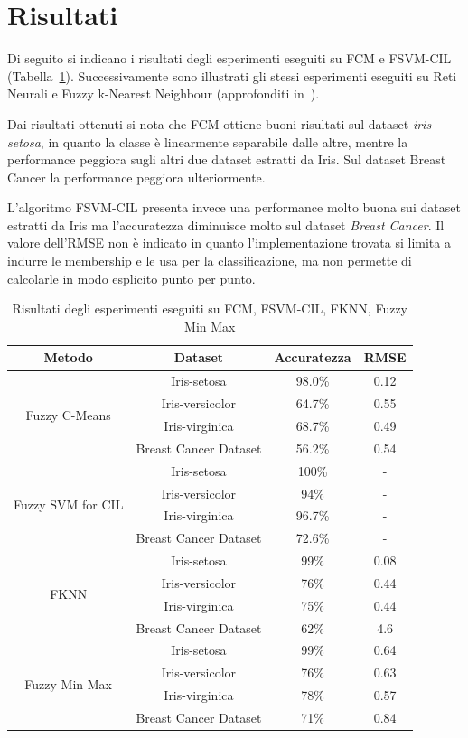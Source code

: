 \documentclass[oneside, openany]{book}
\begin{document}
	\section{Risultati}
		Di seguito si indicano i risultati degli esperimenti eseguiti su FCM e FSVM-CIL (Tabella~\ref{tab:res}). Successivamente sono illustrati gli stessi esperimenti eseguiti su Reti Neurali e Fuzzy k-Nearest Neighbour (approfonditi in~\cite{bib:rita}).
		
		Dai risultati ottenuti si nota che FCM ottiene buoni risultati sul dataset \textit{iris-setosa}, in quanto la classe è linearmente separabile dalle altre, mentre la performance peggiora sugli altri due dataset estratti da Iris. Sul dataset Breast Cancer la performance peggiora ulteriormente.
		
		L'algoritmo FSVM-CIL presenta invece una performance molto buona sui dataset estratti da Iris ma l'accuratezza diminuisce molto sul dataset \textit{Breast Cancer}. Il valore dell'RMSE non è indicato in quanto l'implementazione trovata si limita a indurre le membership e le usa per la classificazione, ma non permette di calcolarle in modo esplicito punto per punto.

		\begin{table}[h]
		\caption{Risultati degli esperimenti eseguiti su FCM, FSVM-CIL, FKNN, Fuzzy Min Max}
		\begin{center}\begin{tabular}{ |c|c|c|c| } 
				\hline
				\textbf{Metodo} & \textbf{Dataset} & \textbf{Accuratezza} & \textbf{RMSE}\\
				\hline
				\multirow{4}{4em}{Fuzzy C-Means} 
				& Iris-setosa & 98.0\% & 0.12\\
				&Iris-versicolor & 64.7\% & 0.55\\
				&Iris-virginica & 68.7\% & 0.49\\
				&Breast Cancer Dataset &  56.2\% & 0.54\\
				\hline
				\multirow{4}{4em}{Fuzzy SVM for CIL}
				&Iris-setosa & 100\% & -\\
				&Iris-versicolor & 94\% & -\\
				&Iris-virginica & 96.7\% & -\\
				&Breast Cancer Dataset &  72.6\% & -\\	
				\hline							
				\multirow{4}{4em}{FKNN}
				&Iris-setosa & 99\% & 0.08 \\
				&Iris-versicolor & 76\% & 0.44 \\
				&Iris-virginica & 75\% & 0.44 \\
				&Breast Cancer Dataset & 62\% & 4.6 \\
				\hline
				\multirow{4}{4em}{Fuzzy Min Max}
				&Iris-setosa & 99\% & 0.64 \\
				&Iris-versicolor & 76\% & 0.63 \\
				&Iris-virginica & 78\% & 0.57 \\
				&Breast Cancer Dataset & 71\%  & 0.84 \\
				\hline           				
			\end{tabular}
		\end{center}
		\label{tab:res}	
		\end{table}
\end{document}
